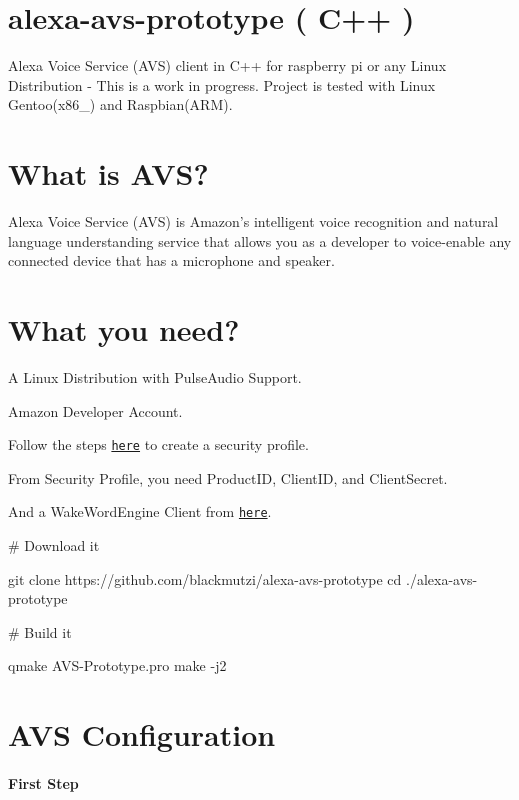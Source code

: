 \href{https://developer.amazon.com/de/alexa-voice-service}{\tt } \section*{alexa-\/avs-\/prototype ( C++ )}

Alexa Voice Service (A\+VS) client in C++ for raspberry pi or any Linux Distribution -\/ This is a work in progress. Project is tested with Linux Gentoo(x86\+\_) and Raspbian(\+A\+R\+M). \section*{What is A\+VS?}

Alexa Voice Service (A\+VS) is Amazon’s intelligent voice recognition and natural language understanding service that allows you as a developer to voice-\/enable any connected device that has a microphone and speaker. \section*{What you need?}


\begin{DoxyItemize}
\item A Linux Distribution with Pulse\+Audio Support.
\item Amazon Developer Account.
\item Follow the steps \href{https://github.com/alexa/alexa-avs-sample-app/wiki/Raspberry-Pi}{\tt here} to create a security profile.
\item From Security Profile, you need Product\+ID, Client\+ID, and Client\+Secret.
\item And a Wake\+Word\+Engine Client from \href{https://github.com/alexa/alexa-avs-sample-app/tree/master/samples/wakeWordAgent}{\tt here}.
\end{DoxyItemize}

\# Download it 
\begin{DoxyCode}
git clone https://github.com/blackmutzi/alexa-avs-prototype
cd ./alexa-avs-prototype
\end{DoxyCode}
 \# Build it 
\begin{DoxyCode}
qmake AVS-Prototype.pro
make -j2
\end{DoxyCode}
 \section*{A\+VS Configuration}

\paragraph*{First Step}

